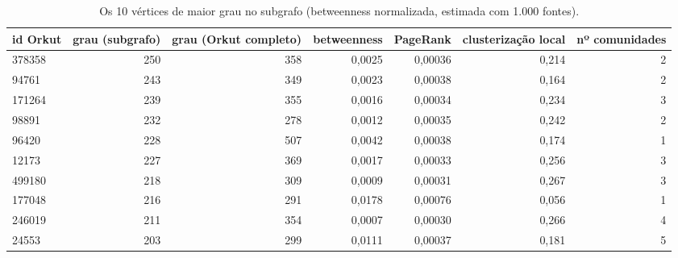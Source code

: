 \begin{table}[!htb]
\centering
\caption{Os 10 vértices de maior grau no subgrafo (betweenness normalizada, estimada com 1.000 fontes).}
\label{tab:hubs}
\begin{adjustbox}{max width=\linewidth}
\begin{tabular}{lrrrrrr}
\toprule
id Orkut & grau (subgrafo) & grau (Orkut completo) & betweenness & PageRank & clusterização local & nº comunidades \\
\midrule
378358 & 250 & 358 & 0,0025 & 0,00036 & 0,214 & 2 \\
94761 & 243 & 349 & 0,0023 & 0,00038 & 0,164 & 2 \\
171264 & 239 & 355 & 0,0016 & 0,00034 & 0,234 & 3 \\
98891 & 232 & 278 & 0,0012 & 0,00035 & 0,242 & 2 \\
96420 & 228 & 507 & 0,0042 & 0,00038 & 0,174 & 1 \\
12173 & 227 & 369 & 0,0017 & 0,00033 & 0,256 & 3 \\
499180 & 218 & 309 & 0,0009 & 0,00031 & 0,267 & 3 \\
177048 & 216 & 291 & 0,0178 & 0,00076 & 0,056 & 1 \\
246019 & 211 & 354 & 0,0007 & 0,00030 & 0,266 & 4 \\
24553 & 203 & 299 & 0,0111 & 0,00037 & 0,181 & 5 \\
\bottomrule
\end{tabular}
\end{adjustbox}
\end{table}
